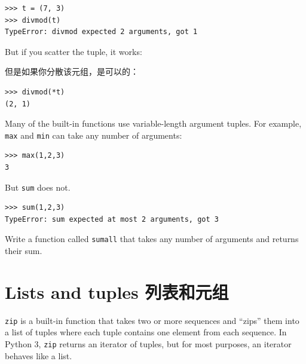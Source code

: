 \documentclass[10pt]{book}
\begin{document}
\begin{CJK}{UTF8}{gbsn}

%

\begin{verbatim}
>>> t = (7, 3)
>>> divmod(t)
TypeError: divmod expected 2 arguments, got 1
\end{verbatim}
%
But if you scatter the tuple, it works:

但是如果你分散该元组，是可以的：

\begin{verbatim}
>>> divmod(*t)
(2, 1)
\end{verbatim}
%
\begin{exercise}

Many of the built-in functions use
variable-length argument tuples.  For example, {\tt max}
and {\tt min} can take any number of arguments:

\begin{verbatim}
>>> max(1,2,3)
3
\end{verbatim}
%
But {\tt sum} does not.

\begin{verbatim}
>>> sum(1,2,3)
TypeError: sum expected at most 2 arguments, got 3
\end{verbatim}
%
Write a function called {\tt sumall} that takes any number
of arguments and returns their sum.

\end{exercise}


\section{Lists and tuples 列表和元组}

{\tt zip} is a built-in function that takes two or more sequences and
``zips'' them into a list of tuples where each tuple contains one
element from each sequence.  In Python 3, {\tt zip} returns an iterator
of tuples, but for most purposes, an iterator behaves like a list.


\end{CJK}
\end{document}
